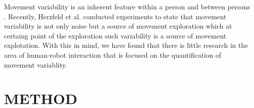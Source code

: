 \documentclass{sigchi}
\begin{document}
Movement variability is an inherent feature within a person and between persons
\cite{newell1993variability}. Recently, Herzfeld et al. \cite{Herzfeld2014}
conducted experiments to state that movement variability is not only noise but a
source of movement exploration which at certaing point of the exploration
such variability is a source of movement explotation.
With this in mind, we have found that there is little research in the area of
human-robot interaction that is focused on the quantification of movement variablity.


%
\section{METHOD}
\end{document}
